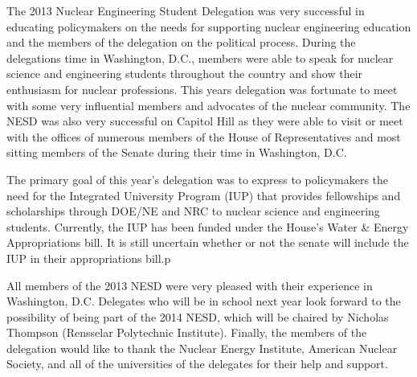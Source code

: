 
The 2013 Nuclear Engineering Student Delegation was very successful in educating
policymakers on the needs for supporting nuclear engineering education and the
members of the delegation on the political process. During the delegations time
in Washington, D.C., members were able to speak for nuclear science and
engineering students throughout the country and show their enthusiasm for
nuclear professions. This years delegation was fortunate to meet with some very
influential members and advocates of the nuclear community. The NESD was also
very successful on Capitol Hill as they were able to visit or meet with the
offices of numerous members of the House of Representatives and most sitting
members of the Senate during their time in Washington, D.C.

The primary goal of this year’s delegation was to express to policymakers the
need for the Integrated University Program (IUP) that provides fellowships and
scholarships through DOE/NE and NRC to nuclear science and engineering
students. Currently, the IUP has been funded under the House's Water \& Energy
Appropriations bill. It is still uncertain whether or not the senate will
include the IUP in their appropriations bill.p

All members of the 2013 NESD were very pleased with their experience in
Washington, D.C. Delegates who will be in school next year look forward to the
possibility of being part of the 2014 NESD, which will be chaired by Nicholas
Thompson (Rensselar Polytechnic Institute). Finally, the members of the
delegation would like to thank the Nuclear Energy Institute, American Nuclear
Society, and all of the universities of the delegates for their help and
support.
